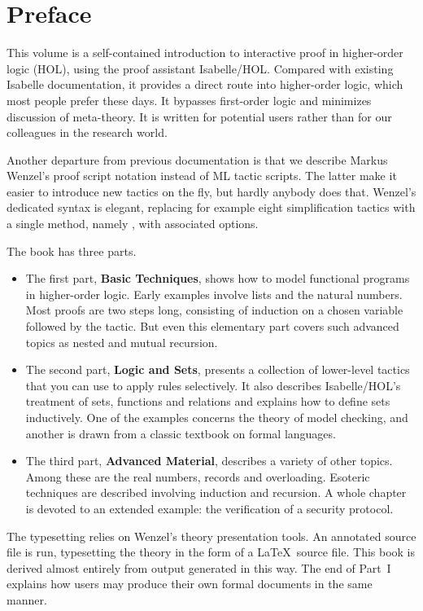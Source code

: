 \chapter*{Preface}

This volume is a self-contained introduction to interactive proof
in higher-order logic (HOL), using the proof assistant Isabelle/HOL\@. 
Compared with existing Isabelle documentation,
it provides a direct route into higher-order logic, which most people
prefer these days. It bypasses first-order logic and minimizes
discussion of meta-theory.  It is written for potential users rather
than for our colleagues in the research world.

%
Another departure from previous documentation is that we describe Markus
Wenzel's proof script notation instead of ML tactic scripts.  The latter
make it easier to introduce new tactics on the fly, but hardly anybody
does that.  Wenzel's dedicated syntax is elegant, replacing for example
eight simplification tactics with a single method, namely ,
with associated options.

The book has three parts.  
\begin{itemize}
\item 
The first part, \textbf{Basic Techniques},
shows how to model functional programs in higher-order logic.  Early
examples involve lists and the natural numbers.  Most proofs
are two steps long, consisting of induction on a chosen variable
followed by the  tactic.  But even this elementary part
covers such advanced topics as nested and mutual recursion.
\item 
The second part, \textbf{Logic and Sets}, presents a collection of
lower-level tactics that you can use to apply rules selectively.  It
also describes Isabelle/HOL's treatment of sets, functions and
relations and explains how to define sets inductively.  One of the
examples concerns the theory of model checking, and another is drawn
from a classic textbook on formal languages.
\item 
The third part, \textbf{Advanced Material}, describes a variety of
other topics.  Among these are the real numbers, records and
overloading.  Esoteric techniques are described involving induction and
recursion.  A whole chapter is devoted to an extended example: the
verification of a security protocol.
\end{itemize}

The typesetting relies on Wenzel's theory presentation tools.  An
annotated source file is run, typesetting the theory
in the form of a \LaTeX\ source file.  This book is
derived almost entirely from output generated in this way.
The end of Part~I explains how users may produce their own formal documents in
the same manner.

